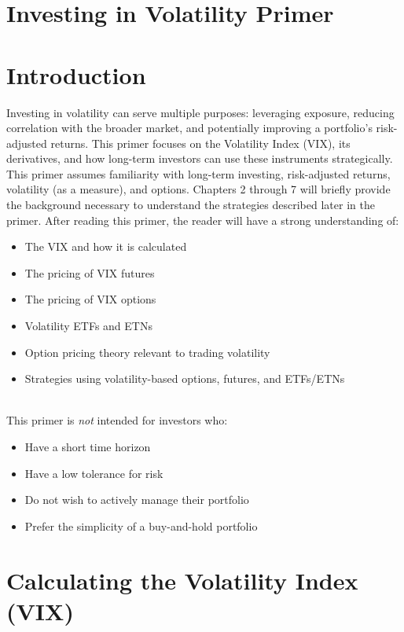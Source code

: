 \documentclass[11pt, oneside]{book}
\begin{document}
\frontmatter
%
\chapter*{\Huge \center Investing in Volatility Primer }
\tableofcontents
\mainmatter
\chapter{Introduction} \label{Intro}
Investing in volatility can serve multiple purposes: leveraging exposure, reducing correlation with the broader market, and potentially improving a portfolio’s risk-adjusted returns. This primer focuses on the Volatility Index (VIX), its derivatives, and how long-term investors can use these instruments strategically. This primer assumes familiarity with long-term investing, risk-adjusted returns, volatility (as a measure), and options. Chapters 2 through 7 will briefly provide the background necessary to understand the strategies described later in the primer. After reading this primer, the reader will have a strong understanding of:
\begin{itemize}
    \item The VIX and how it is calculated
    \item The pricing of VIX futures
    \item The pricing of VIX options
    \item Volatility ETFs and ETNs
    \item Option pricing theory relevant to trading volatility
    \item Strategies using volatility-based options, futures, and ETFs/ETNs
\end{itemize}\  \\
This primer is \textit{not} intended for investors who:
\begin{itemize}
    \item Have a short time horizon
    \item Have a low tolerance for risk
    \item Do not wish to actively manage their portfolio
    \item Prefer the simplicity of a buy-and-hold portfolio
\end{itemize}


\chapter{Calculating the Volatility Index (VIX)} \label{CalcVix}
\end{document}
